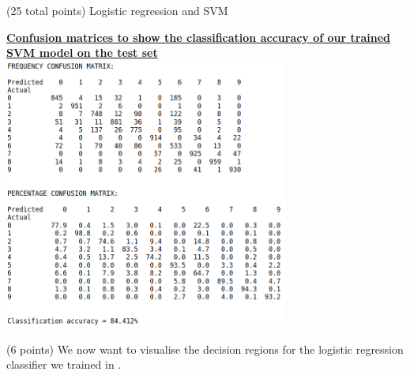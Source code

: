 \documentclass[12pt]{article}
\begin{document}
\begin{question}{(25 total points) Logistic regression and SVM}
\begin{subquestion}
   

      \begin{answerbox}{30em}
        \begin{center}
        \textbf{\underline{Confusion matrices to show the classification accuracy of our trained}}\\
        \textbf{\underline{SVM model on the test set}}
        \vspace{0.3cm}\\
         \includegraphics[width=0.7\textwidth]{images/q22.png}
        \end{center}
      \end{answerbox}
  


   \end{subquestion}
   \begin{subquestion}{(6 points)
       We now want to visualise the decision regions for the logistic
       regression classifier we trained in .
     } \label{Q2.3}


   


\end{subquestion}
\end{question}
\end{document}
